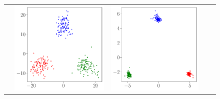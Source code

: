 \begin{figure}[ht]
{\begin{tabular}{m{.03\linewidth}*4{C}@{}}
            & \includegraphics[width=\linewidth]{figures/resnet_penultimate_plot_1.pdf} 
            & \includegraphics[width=\linewidth]{figures/resnet_penultimate_plot_3.pdf} 

\end{tabular}}
\end{figure}
